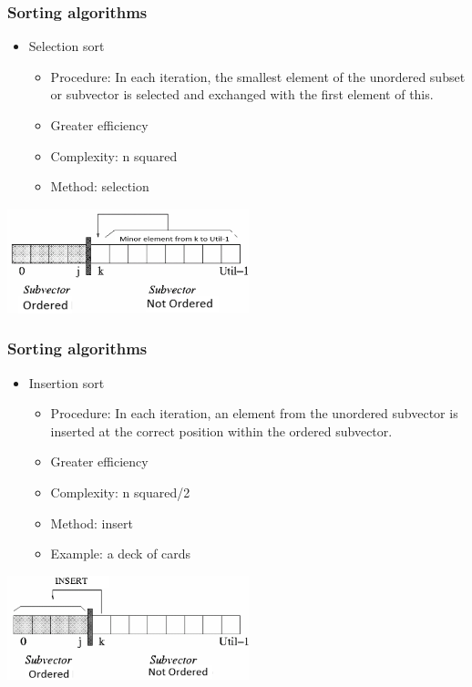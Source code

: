 \documentclass[11pt]{beamer}
\begin{document}
\begin{frame}
\frametitle{Sorting algorithms }
\begin{itemize}
\item Selection sort
\begin{itemize}
\item Procedure: In each iteration, the smallest element of the unordered subset or subvector is selected and exchanged with the first element of this.
\item Greater efficiency
\item Complexity: n squared
\item Method: selection
\end{itemize}
\end{itemize}
\begin{center}
\includegraphics[width=7.0cm]{img/selec.png}
\end{center}
\end{frame}


\begin{frame}
\frametitle{Sorting algorithms}
\begin{itemize}
\item Insertion sort
\begin{itemize}
\item Procedure: In each iteration, an element from the unordered subvector is inserted at the correct position within the ordered subvector.
\item Greater efficiency
\item Complexity: n squared/2
\item Method: insert
\item Example: a deck of cards
\end{itemize}
\end{itemize}
\begin{center}
\includegraphics[width=7.0cm]{img/inser.png}
\end{center}
\end{frame}
\end{document}
